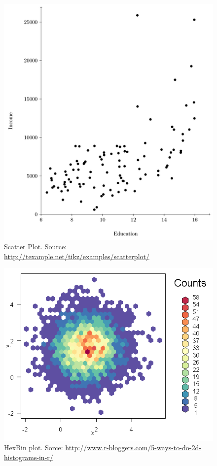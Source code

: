 \documentclass[12pt,a4paper]{report}
\begin{document}
\begin{figure}
\centering
\includegraphics[height=0.3\textheight]{art/scatterplot}
\caption[Scatter Plot]{Scatter Plot. Source: \url{http://texample.net/tikz/examples/scatterplot/}}
\label{fig:scatterplot}
\end{figure}



\begin{figure}
\centering
\includegraphics[height=0.3\textheight]{art/hexbin2}
\caption[HexBin Plot]{HexBin plot. Sorce: \url{http://www.r-bloggers.com/5-ways-to-do-2d-histograms-in-r/}}
\label{fig:hexbin}
\end{figure}
\end{document}
